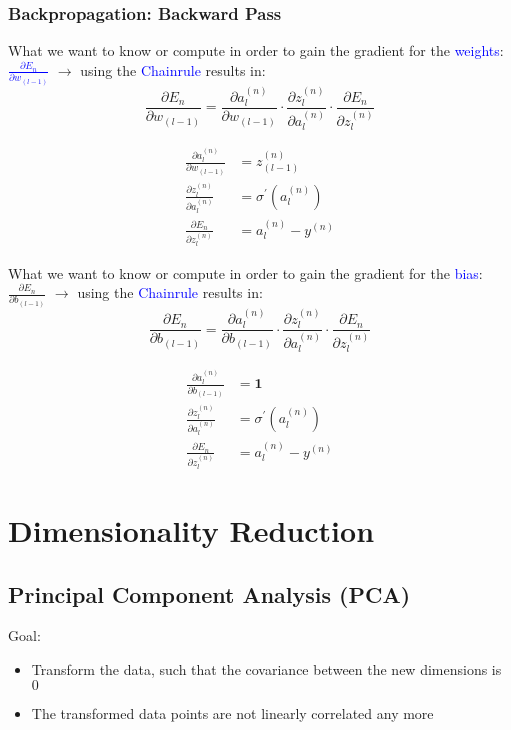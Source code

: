 \documentclass[a4paper,10pt,twoside=true,DIV=10,headsepline,plainheadsepline]{scrartcl}
\begin{document}
	\subsubsection{Backpropagation: Backward Pass}

	What we want to know or compute in order to gain the gradient for the \textcolor{blue}{weights}: \textcolor{blue}{$\frac{\partial E_n}{\partial w_{(l-1)}}$} $\rightarrow$ using the \textcolor{blue}{Chainrule} results in:
		\begin{equation} 
			\frac{\partial E_n}{\partial w_{(l-1)}} = \frac{\partial a_l^{(n)}}{\partial w_{(l-1)}} \cdot \frac{\partial z_l^{(n)}}{\partial a_l^{(n)}} \cdot \frac{\partial E_n}{\partial z_l^{(n)}}
		\end{equation}
		
		\begin{align} 
			\frac{\partial a_l^{(n)}}{\partial w_{(l-1)}} &= z_{(l-1)}^{(n)} \\
			\frac{\partial z_l^{(n)}}{\partial a_l^{(n)}} &= \sigma^{\prime} (a_l^{(n)}) \\
			\frac{\partial E_n}{\partial z_l^{(n)}} &= a_l^{(n)} - y^{(n)}
		\end{align}
		\newline

	What we want to know or compute in order to gain the gradient for the \textcolor{blue}{bias}: {$\frac{\partial E_n}{\partial b_{(l-1)}}$} $\rightarrow$ using the \textcolor{blue}{Chainrule} results in:
		\begin{equation} 
			\frac{\partial E_n}{\partial b_{(l-1)}} = \frac{\partial a_l^{(n)}}{\partial b_{(l-1)}} \cdot \frac{\partial z_l^{(n)}}{\partial a_l^{(n)}} \cdot \frac{\partial E_n}{\partial z_l^{(n)}}
		\end{equation}
		
		\begin{align} 
			\frac{\partial a_l^{(n)}}{\partial b_{(l-1)}} &= \mathbf{1} \\
			\frac{\partial z_l^{(n)}}{\partial a_l^{(n)}} &= \sigma^{\prime} (a_l^{(n)}) \\
			\frac{\partial E_n}{\partial z_l^{(n)}} &= a_l^{(n)} - y^{(n)}
		\end{align}



	\section{Dimensionality Reduction}
		\subsection{Principal Component Analysis (PCA)}
		Goal: 
		\begin{itemize}[noitemsep,nolistsep]
			\item Transform the data, such that the covariance between the new dimensions is $0$
			\item The transformed data points are not linearly correlated any more
		\end{itemize}
\end{document}
